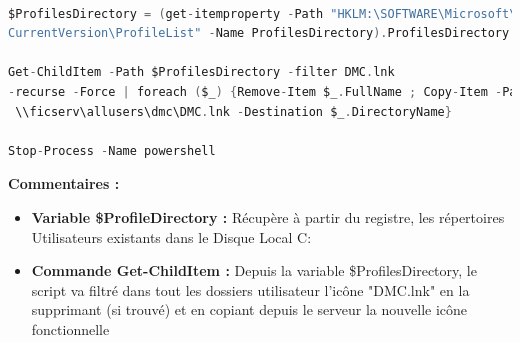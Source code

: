\documentclass[11pt,a4paper,oneside]{article}
\begin{document}
\begin{lstlisting}[language=C]

$ProfilesDirectory = (get-itemproperty -Path "HKLM:\SOFTWARE\Microsoft\Windows NT\
CurrentVersion\ProfileList" -Name ProfilesDirectory).ProfilesDirectory

Get-ChildItem -Path $ProfilesDirectory -filter DMC.lnk 
-recurse -Force | foreach ($_) {Remove-Item $_.FullName ; Copy-Item -Path
 \\ficserv\allusers\dmc\DMC.lnk -Destination $_.DirectoryName}

Stop-Process -Name powershell

\end{lstlisting}
\textbf{Commentaires :}\\
\begin{itemize}
\item \textbf{Variable \$ProfileDirectory :} Récupère à partir du registre, les répertoires Utilisateurs existants dans le Disque Local C: 
\item \textbf{Commande Get-ChildItem :} Depuis la variable \$ProfilesDirectory, le script va filtré dans tout les dossiers utilisateur l'icône "DMC.lnk" en la supprimant (si trouvé) et en copiant depuis le serveur la nouvelle icône fonctionnelle 
\end{itemize}
\end{document}
